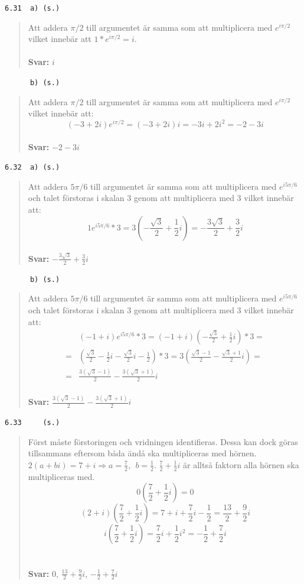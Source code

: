 \documentclass[a4paper]{article}
\newcommand{\tskcol}[1]{\textcolor{tskcol}{#1}}
\begin{document}
	\texttt{\tskcol{6.31~~a) (s.)}}
	\begin{quotation}
		\noindent
		Att addera $\pi/2$ till argumentet är samma som att multiplicera med $e^{i\pi/2}$ vilket innebär att $1*e^{i\pi/2}=i$.
		\\ \\
		\textbf{Svar:} $i$
	\end{quotation}
	
	\texttt{\tskcol{~~~~~~b) (s.)}}
	\begin{quotation}
		\noindent
		Att addera $\pi/2$ till argumentet är samma som att multiplicera med $e^{i\pi/2}$ vilket innebär att:
		\[(-3+2i)e^{i\pi/2}=
		(-3+2i)i=
		-3i+2i^2=
		-2-3i\]
		\\
		\textbf{Svar:} $-2-3i$
	\end{quotation}
	
	\texttt{\tskcol{6.32~~a) (s.)}}
	\begin{quotation}
		\noindent
		Att addera $5\pi/6$ till argumentet är samma som att multiplicera med $e^{i5\pi/6}$ och talet förstoras i skalan 3 genom att multiplicera med 3 vilket innebär att:
		\[1e^{i5\pi/6}*3=
		3(-\frac{\sqrt{3}}{2}+\frac{1}{2}i)=
		-\frac{3\sqrt{3}}{2}+\frac{3}{2}i\]
		\\
		\textbf{Svar:} $-\frac{3\sqrt{3}}{2}+\frac{3}{2}i$
	\end{quotation}
	
	\texttt{\tskcol{~~~~~~b) (s.)}}
	\begin{quotation}
		\noindent
		Att addera $5\pi/6$ till argumentet är samma som att multiplicera med $e^{i5\pi/6}$ och talet förstoras i skalan 3 genom att multiplicera med 3 vilket innebär att:
		\begin{align*}
		&(-1+i)e^{i5\pi/6}*3=
		(-1+i)(-\frac{\sqrt{3}}{2}+\frac{1}{2}i)*3= \\ =
		&(\frac{\sqrt{3}}{2}-\frac{1}{2}i-\frac{\sqrt{3}}{2}i-\frac{1}{2})*3=
		3(\frac{\sqrt{3}-1}{2}-\frac{\sqrt{3}+1}{2}i)= \\ =
		&\frac{3(\sqrt{3}-1)}{2}-\frac{3(\sqrt{3}+1)}{2}i
		\end{align*}
		\\
		\textbf{Svar:} $\frac{3(\sqrt{3}-1)}{2}-\frac{3(\sqrt{3}+1)}{2}i$
	\end{quotation}
	
	\texttt{\tskcol{6.33~~~~ (s.)}}
	\begin{quotation}
		\noindent
		Först måste förstoringen och vridningen identifieras. Dessa kan dock göras tillsammans eftersom båda ändå ska multipliceras med hörnen. $2(a+bi)=7+i \Rightarrow a=\frac{7}{2},~~ b=\frac{1}{2}$. $\frac{7}{2}+\frac{1}{2}i$ är alltså faktorn alla hörnen ska multipliceras med.
		\[0(\frac{7}{2}+\frac{1}{2}i)=0\]
		\[(2+i)(\frac{7}{2}+\frac{1}{2}i)=7+i+\frac{7}{2}i-\frac{1}{2}=\frac{13}{2}+\frac{9}{2}i\]
		\[i(\frac{7}{2}+\frac{1}{2}i)=\frac{7}{2}i+\frac{1}{2}i^2=-\frac{1}{2}+\frac{7}{2}i\]
		\\ \\
		\textbf{Svar:} $0$, $\frac{13}{2}+\frac{9}{2}i$, $-\frac{1}{2}+\frac{7}{2}i$
	\end{quotation}
	
\end{document}
